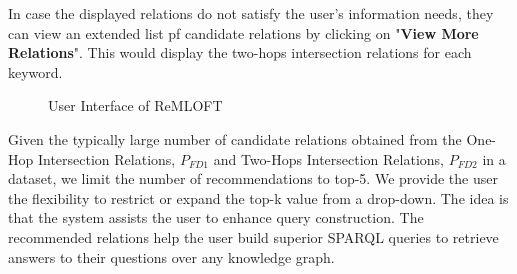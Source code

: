 \begin{sloppypar}
In case the displayed relations do not satisfy the user's information needs, they can view an extended list pf candidate relations by clicking on "\textbf{View More Relations}". This would display the two-hops intersection relations for each keyword. 
\begin{figure}[h]
    \centering
    \caption{User Interface of ReMLOFT}
    \label{fig:userinterface}
\end{figure}
Given the typically large number of candidate relations obtained from the One-Hop Intersection Relations, $P_{FD1}$ and Two-Hops Intersection Relations, $P_{FD2}$ in a dataset, we limit the number of recommendations to top-5. We provide the user the flexibility to restrict or expand the top-k value from a drop-down. The idea is that the system assists the user to enhance query construction. 
The recommended relations help the user build superior SPARQL queries to retrieve answers to their questions over any knowledge graph. 

\end{sloppypar}